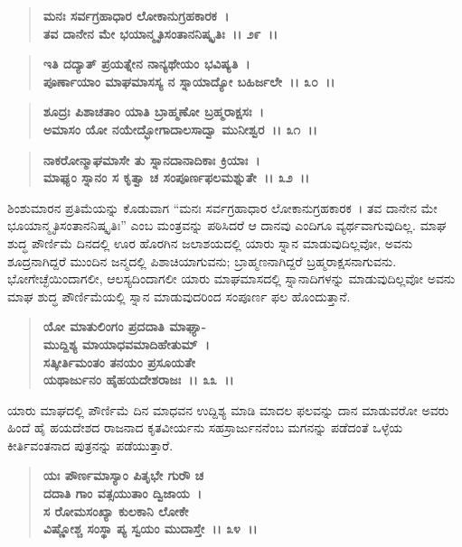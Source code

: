 \begin{verse}
\textbf{ಮನಃ ಸರ್ವಗ್ರಹಾಧಾರ ಲೋಕಾನುಗ್ರಹಕಾರಕ~।}\\\textbf{ತವ ದಾನೇನ ಮೇ ಭಯಾನ್ಮೃತಿಸಂತಾನನಿಷ್ಕೃತಿಃ~।। ೨೯~।। }
\end{verse}

\begin{verse}
\textbf{ಇತಿ ದದ್ಯಾತ್ ಪ್ರಯತ್ನೇನ ನಾನ್ಯಥೇಯಂ ಭವಿಷ್ಯತಿ~।}\\\textbf{ಪೂರ್ಣಾಯಾಂ ಮಾಘಮಾಸಸ್ಯ ನ ಸ್ನಾಯಾದ್ಯೋ ಬಹಿರ್ಜಲೇ~।। ೩೦~।। }
\end{verse}

\begin{verse}
\textbf{ಶೂದ್ರಃ ಪಿಶಾಚತಾಂ ಯಾತಿ ಬ್ರಾಹ್ಮಣೋ ಬ್ರಹ್ಮರಾಕ್ಷಸಃ~।}\\\textbf{ಅಮಾಸಂ ಯೋ ನಯೇದ್ಭೋಗಾದಾಲಸಾದ್ವಾ ಮುನೀಶ್ವರ~।। ೩೧~।। }
\end{verse}

\begin{verse}
\textbf{ನಾಕರೋನ್ಮಾಘಮಾಸೇ ತು ಸ್ನಾನದಾನಾದಿಕಾಃ ಕ್ರಿಯಾಃ~।}\\\textbf{ಮಾಘ್ಯಂ ಸ್ನಾನಂ ಸ ಕೃತ್ವಾ ಚ ಸಂಪೂರ್ಣಫಲಮಶ್ನುತೇ~।। ೩೨~।।}
\end{verse}

ಶಿಂಶುಮಾರನ ಪ್ರತಿಮೆಯನ್ನು ಕೊಡುವಾಗ “ಮನಃ ಸರ್ವಗ್ರಹಾಧಾರ ಲೋಕಾನುಗ್ರಹಕಾರಕ~। ತವ ದಾನೇನ ಮೇ ಭೂಯಾನ್ಮೃತಿಸಂತಾನನಿಷ್ಕೃತಿಃ” ಎಂಬ ಮಂತ್ರವನ್ನು ಪಠಿಸಿದರೆ ಆ ದಾನವು ಎಂದಿಗೂ ವ್ಯರ್ಥವಾಗುವುದಿಲ್ಲ. ಮಾಘ ಶುದ್ಧ ಪೌರ್ಣಿಮೆ ದಿನದಲ್ಲಿ ಊರ ಹೊರಗಿನ ಜಲಾಶಯದಲ್ಲಿ ಯಾರು ಸ್ನಾನ ಮಾಡುವುದಿಲ್ಲವೋ, ಅವನು ಶೂದ್ರನಾಗಿದ್ದರೆ ಮುಂದಿನ ಜನ್ಮದಲ್ಲಿ ಪಿಶಾಚಿಯಾಗುವನು; ಬ್ರಾಹ್ಮಣನಾಗಿದ್ದರೆ ಬ್ರಹ್ಮರಾಕ್ಷಸನಾಗುವನು. ಭೋಗೇಚ್ಛೆಯಿಂದಾಗಲೀ, ಆಲಸ್ಯದಿಂದಾಗಲೀ ಯಾರು ಮಾಘಮಾಸದಲ್ಲಿ ಸ್ನಾನಾದಿಗಳನ್ನು ಮಾಡುವುದಿಲ್ಲವೋ ಅವನು ಮಾಘ ಶುದ್ಧ ಪೌರ್ಣಿಮೆಯಲ್ಲಿ ಸ್ನಾನ ಮಾಡುವುದರಿಂದ ಸಂಪೂರ್ಣ ಫಲ ಹೊಂದುತ್ತಾನೆ.

\begin{verse}
\textbf{ಯೋ ಮಾತುಲಿಂಗಂ ಪ್ರದದಾತಿ ಮಾಘ್ಯಾ-}\\\textbf{ಮುದ್ದಿಶ್ಯ ಮಾಯಾಧವಮಾದಿಹೇತುಮ್~।}\\\textbf{ಸತ್ಕೀರ್ತಿಮಂತಂ ತನಯಂ ಪ್ರಸೂಯತೇ} \\\textbf{ಯಥಾರ್ಜುನಂ ಹೈಹಯದೇಶರಾಜಃ~।। ೩೩~।।}
\end{verse}

ಯಾರು ಮಾಘದಲ್ಲಿ ಪೌರ್ಣಿಮೆ ದಿನ ಮಾಧವನ ಉದ್ದಿಶ್ಯ ಮಾಡಿ ಮಾದಲ ಫಲವನ್ನು ದಾನ ಮಾಡುವರೋ ಅವರು ಹಿಂದೆ ಹೈ ಹಯದೇಶದ ರಾಜನಾದ ಕೃತವೀರ್ಯನು ಸಹಸ್ರಾರ್ಜುನನೆಂಬ ಮಗನನ್ನು ಪಡೆದಂತೆ ಒಳ್ಳೆಯ ಕೀರ್ತಿವಂತನಾದ ಪುತ್ರನನ್ನು ಪಡೆಯುತ್ತಾರೆ.

\begin{verse}
\textbf{ಯಃ ಪೌರ್ಣಮಾಸ್ಯಾಂ ಪಿತೃಭೇ ಗುರೌ‌ ಚ} \\\textbf{ದದಾತಿ ಗಾಂ ವತ್ಸಯುತಾಂ ದ್ವಿಜಾಯ~।}\\\textbf{ಸ ರೋಮಸಂಖ್ಯಾ ಕುಲಕಾನಿ ಲೋಕೇ} \\\textbf{ವಿಷ್ಣೋಶ್ಚ ಸಂಸ್ಥಾ ಪ್ಯ ಸ್ವಯಂ ಮುದಾಸ್ತೇ~।। ೩೪~।।}
\end{verse}

